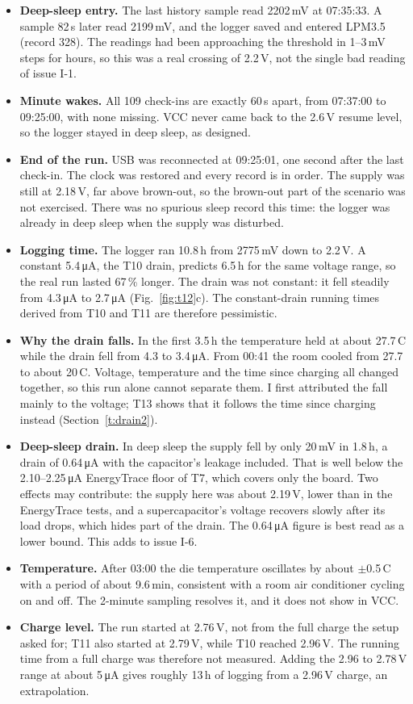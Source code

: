 \documentclass[11pt,a4paper]{article}
\newcommand{\uA}{\,\si{\micro\ampere}}
\begin{document}
\begin{itemize}
  \item \textbf{Deep-sleep entry.} The last history sample read 2202\,mV at 07:35:33. A sample 82\,s later read 2199\,mV, and the logger saved and entered LPM3.5 (record 328). The readings had been approaching the threshold in 1--3\,mV steps for hours, so this was a real crossing of 2.2\,V, not the single bad reading of issue I-1.
  \item \textbf{Minute wakes.} All 109 check-ins are exactly 60\,s apart, from 07:37:00 to 09:25:00, with none missing. VCC never came back to the 2.6\,V resume level, so the logger stayed in deep sleep, as designed.
  \item \textbf{End of the run.} USB was reconnected at 09:25:01, one second after the last check-in. The clock was restored and every record is in order. The supply was still at 2.18\,V, far above brown-out, so the brown-out part of the scenario was not exercised. There was no spurious sleep record this time: the logger was already in deep sleep when the supply was disturbed.
  \item \textbf{Logging time.} The logger ran 10.8\,h from 2775\,mV down to 2.2\,V. A constant 5.4\uA, the T10 drain, predicts 6.5\,h for the same voltage range, so the real run lasted 67\,\% longer. The drain was not constant: it fell steadily from 4.3\uA{} to 2.7\uA{} (Fig.~\ref{fig:t12}c). The constant-drain running times derived from T10 and T11 are therefore pessimistic.
  \item \textbf{Why the drain falls.} In the first 3.5\,h the temperature held at about 27.7\,\textdegree C while the drain fell from 4.3 to 3.4\uA. From 00:41 the room cooled from 27.7 to about 20\,\textdegree C. Voltage, temperature and the time since charging all changed together, so this run alone cannot separate them. I first attributed the fall mainly to the voltage; T13 shows that it follows the time since charging instead (Section~\ref{t:drain2}).
  \item \textbf{Deep-sleep drain.} In deep sleep the supply fell by only 20\,mV in 1.8\,h, a drain of 0.64\uA{} with the capacitor's leakage included. That is well below the 2.10--2.25\uA{} EnergyTrace floor of T7, which covers only the board. Two effects may contribute: the supply here was about 2.19\,V, lower than in the EnergyTrace tests, and a supercapacitor's voltage recovers slowly after its load drops, which hides part of the drain. The 0.64\uA{} figure is best read as a lower bound. This adds to issue I-6.
  \item \textbf{Temperature.} After 03:00 the die temperature oscillates by about $\pm$0.5\,\textdegree C with a period of about 9.6\,min, consistent with a room air conditioner cycling on and off. The 2-minute sampling resolves it, and it does not show in VCC.
  \item \textbf{Charge level.} The run started at 2.76\,V, not from the full charge the setup asked for; T11 also started at 2.79\,V, while T10 reached 2.96\,V. The running time from a full charge was therefore not measured. Adding the 2.96 to 2.78\,V range at about 5\uA{} gives roughly 13\,h of logging from a 2.96\,V charge, an extrapolation.
\end{itemize}
\end{document}
